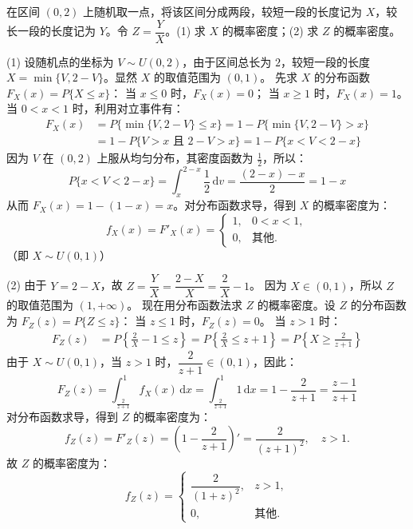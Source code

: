 ﻿\documentclass[lang=cn,11pt]{elegantbook}
\begin{document}
\begin{exercise}[分段随机变量的函数] \label{exer:2-21}
在区间 $(0,2)$ 上随机取一点，将该区间分成两段，较短一段的长度记为 $X$，较长一段的长度记为 $Y$。令 $Z = \dfrac{Y}{X}$。(1) 求 $X$ 的概率密度；(2) 求 $Z$ 的概率密度。
\end{exercise}
\begin{solution}
(1) 设随机点的坐标为 $V \sim U(0,2)$，由于区间总长为 $2$，较短一段的长度 $X = \min\{V, 2-V\}$。显然 $X$ 的取值范围为 $(0,1)$。
先求 $X$ 的分布函数 $F_X(x) = P\{X \le x\}$：
当 $x \le 0$ 时，$F_X(x) = 0$；
当 $x \ge 1$ 时，$F_X(x) = 1$。
当 $0 < x < 1$ 时，利用对立事件有：
\[
\begin{aligned}
F_X(x) &= P\{\min\{V, 2-V\} \le x\} = 1 - P\{\min\{V, 2-V\} > x\} \\
&= 1 - P\{V > x \text{ 且 } 2-V > x\} = 1 - P\{x < V < 2-x\}
\end{aligned}
\]
因为 $V$ 在 $(0,2)$ 上服从均匀分布，其密度函数为 $\frac{1}{2}$，所以：
\[
P\{x < V < 2-x\} = \int_{x}^{2-x} \frac{1}{2} \,\mathrm{d}v = \frac{(2-x) - x}{2} = 1 - x
\]
从而 $F_X(x) = 1 - (1 - x) = x$。对分布函数求导，得到 $X$ 的概率密度为：
\[
f_X(x) = F'_X(x) = \begin{cases}
1, & 0 < x < 1, \\[4pt]
0, & \text{其他}.
\end{cases}
\]
（即 $X \sim U(0,1)$）

(2) 由于 $Y = 2 - X$，故 $Z = \dfrac{Y}{X} = \dfrac{2-X}{X} = \dfrac{2}{X} - 1$。
因为 $X \in (0,1)$，所以 $Z$ 的取值范围为 $(1, +\infty)$。
现在用分布函数法求 $Z$ 的概率密度。设 $Z$ 的分布函数为 $F_Z(z) = P\{Z \le z\}$：
当 $z \le 1$ 时，$F_Z(z) = 0$。
当 $z > 1$ 时：
\[
\begin{aligned}
F_Z(z) &= P\left\{\frac{2}{X} - 1 \le z\right\} = P\left\{\frac{2}{X} \le z + 1\right\} = P\left\{X \ge \frac{2}{z+1}\right\}
\end{aligned}
\]
由于 $X \sim U(0,1)$，当 $z > 1$ 时，$\dfrac{2}{z+1} \in (0, 1)$，因此：
\[
F_Z(z) = \int_{\frac{2}{z+1}}^{1} f_X(x) \,\mathrm{d}x = \int_{\frac{2}{z+1}}^{1} 1 \,\mathrm{d}x = 1 - \frac{2}{z+1} = \frac{z-1}{z+1}
\]
对分布函数求导，得到 $Z$ 的概率密度为：
\[
f_Z(z) = F'_Z(z) = \left( 1 - \frac{2}{z+1} \right)' = \frac{2}{(z+1)^2}, \quad z > 1.
\]
故 $Z$ 的概率密度为：
\[
f_Z(z) = \begin{cases}
\dfrac{2}{(1+z)^2}, & z > 1, \\[6pt]
0, & \text{其他}.
\end{cases}
\]
\end{solution}
\end{document}
